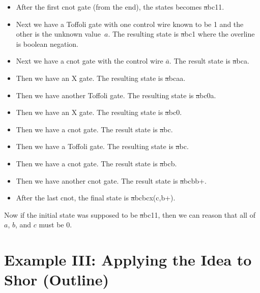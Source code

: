 \documentclass{article}
\begin{document}
\begin{itemize}
\item After the first \textsf{cnot} gate (from the end), the states
  becomes \st{a}{b}{c}{1}{1}.
\item Next we have a Toffoli gate with one control wire known to be 1
  and the other is the unknown value~$a$. The resulting state
  is \st{a}{b}{c}{1}{} where the overline is boolean negation.
\item Next we have a \textsf{cnot} gate with the control wire
  $\overline{a}$. The result state is \st{a}{b}{c}{a}{}.
\item Then we have an \textsf{X} gate. The resulting state is
  \st{a}{b}{c}{a}{a}.
\item Then we have another \textsf{Toffoli} gate. The resulting state is
   \st{a}{b}{c}{0}{a}.
\item Then we have an \textsf{X} gate. The resulting state is
  \st{a}{b}{c}{0}{}.
\item Then we have a \textsf{cnot} gate. The result state is
    \st{a}{b}{c}{}{}.
\item Then we have a \textsf{Toffoli} gate. The resulting state is
   \st{a}{b}{c}{}{}.
\item Then we have a \textsf{cnot} gate. The result state is
      \st{a}{b}{c}{b}{}.
\item Then we have another \textsf{cnot} gate. The result state is
      \st{a}{b}{c}{b}{b+}.
\item After the last \textsf{cnot}, the final state is
      \st{a}{b}{c}{b}{\textsf{cx}(c,b+)}.
\end{itemize}

Now if the initial state was supposed to be \st{a}{b}{c}{1}{1}, then we
can reason that all of $a$, $b$, and $c$ must be 0.

\section{Example III: Applying the Idea to Shor (Outline)}
\end{document}
